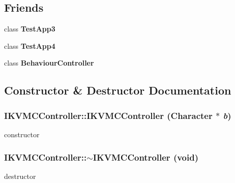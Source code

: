 \subsection*{Friends}
\begin{DoxyCompactItemize}
\item 
\hypertarget{classCartWheel_1_1Core_1_1IKVMCController_a5a2ca3c4b5068c8b03db27b9d6e09675}{
class {\bfseries TestApp3}}
\label{classCartWheel_1_1Core_1_1IKVMCController_a5a2ca3c4b5068c8b03db27b9d6e09675}

\item 
\hypertarget{classCartWheel_1_1Core_1_1IKVMCController_a8feadc6c140ca29db8be998c18390148}{
class {\bfseries TestApp4}}
\label{classCartWheel_1_1Core_1_1IKVMCController_a8feadc6c140ca29db8be998c18390148}

\item 
\hypertarget{classCartWheel_1_1Core_1_1IKVMCController_a780a8b03a34ab6eb2a7c3944c135ac33}{
class {\bfseries BehaviourController}}
\label{classCartWheel_1_1Core_1_1IKVMCController_a780a8b03a34ab6eb2a7c3944c135ac33}

\end{DoxyCompactItemize}


\subsection{Constructor \& Destructor Documentation}
\hypertarget{classCartWheel_1_1Core_1_1IKVMCController_a1eb43256c937b02a1f903fc4a268206f}{
\subsubsection[{IKVMCController}]{\setlength{\rightskip}{0pt plus 5cm}IKVMCController::IKVMCController ({\bf Character} $\ast$ {\em b})}}
\label{classCartWheel_1_1Core_1_1IKVMCController_a1eb43256c937b02a1f903fc4a268206f}
constructor \hypertarget{classCartWheel_1_1Core_1_1IKVMCController_a11bca200b630959187dd7182c9acbff9}{
\subsubsection[{$\sim$IKVMCController}]{\setlength{\rightskip}{0pt plus 5cm}IKVMCController::$\sim$IKVMCController (void)}}
\label{classCartWheel_1_1Core_1_1IKVMCController_a11bca200b630959187dd7182c9acbff9}
destructor 

